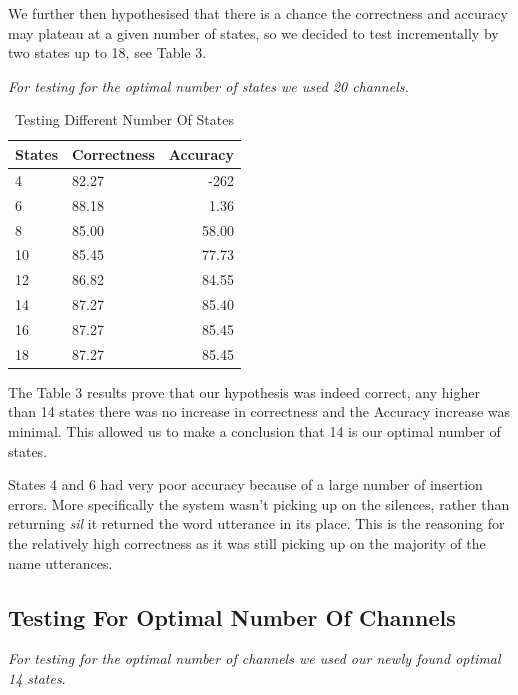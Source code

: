 \documentclass[	DIV=calc,%
							paper=a4,%
							fontsize=9.8pt,%
							twocolumn]{scrartcl}	 					%
\begin{document}
We further then hypothesised that there is a chance the correctness and accuracy may plateau at a given number of states, so we decided to test incrementally by two states up to 18, see Table 3.
 
 \textit{For testing for the optimal number of states we used 20 channels.}

\begin{table}[h]
	\caption{Testing Different Number Of States}
	\centering
	\begin{tabular}{llr}
		
		\cmidrule(r){1-3}
		States & Correctness & Accuracy \\
		\midrule
		4 & 82.27 & -262 \\
		6  & 88.18  & 1.36 \\
		8   & 85.00  & 58.00 \\
	    10   & 85.45 & 77.73\\
	    12   & 86.82  & 84.55 \\
		14   & 87.27  & 85.40 \\
		16  & 87.27  & 85.45 \\
		18  & 87.27  & 85.45 \\
		
	\end{tabular}
\end{table}
The Table 3 results prove that our hypothesis was indeed correct, any higher than 14 states there was no increase in correctness and the Accuracy increase was minimal. This allowed us to make a conclusion that 14 is our optimal number of states.

States 4 and 6 had very poor accuracy because of a large number of insertion errors. More specifically the system wasn't picking up on the silences, rather than returning \textit{sil} it returned the word utterance in its place. This is the reasoning for the relatively high correctness as it was still picking up on the majority of the name utterances.

\subsection{Testing For Optimal Number Of Channels}
\textit{For testing for the optimal number of channels  we used our newly found optimal 14 states}.
\end{document}
